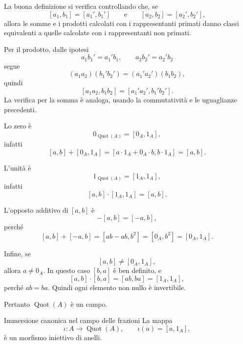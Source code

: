 \documentclass[a4paper]{article}
\begin{document}
\begin{radioactive}
\begin{snippetproof}{}
    La buona definizione si verifica controllando che, se
    \[
        [a_1,b_1]=[a_1',b_1']
        \qquad
        \text{e}
        \qquad
        [a_2,b_2]=[a_2',b_2'],
    \]
    allora le somme e i prodotti calcolati con i rappresentanti primati danno classi equivalenti a quelle calcolate con i rappresentanti non primati.

    Per il prodotto, dalle ipotesi
    \[
        a_1b_1'=a_1'b_1,
        \qquad
        a_2b_2'=a_2'b_2
    \]
    segue
    \[
        (a_1a_2)(b_1'b_2')
        =
        (a_1'a_2')(b_1b_2),
    \]
    quindi
    \[
        [a_1a_2,b_1b_2]
        =
        [a_1'a_2',b_1'b_2'].
    \]
    La verifica per la somma è analoga, usando la commutatività e le uguaglianze precedenti.

    Lo zero è
    \[
        0_{\operatorname{Quot}(A)}=[0_A,1_A],
    \]
    infatti
    \[
        [a,b]+[0_A,1_A]
        =
        [a\cdot 1_A+0_A\cdot b,b\cdot 1_A]
        =
        [a,b].
    \]

    L'unità è
    \[
        1_{\operatorname{Quot}(A)}=[1_A,1_A],
    \]
    infatti
    \[
        [a,b]\cdot [1_A,1_A]
        =
        [a,b].
    \]

    L'opposto additivo di \([a,b]\) è
    \[
        -[a,b]=[-a,b],
    \]
    perché
    \[
        [a,b]+[-a,b]=[ab-ab,b^2]=[0_A,b^2]=[0_A,1_A].
    \]

    Infine, se
    \[
        [a,b]\neq [0_A,1_A],
    \]
    allora \(a\neq 0_A\). In questo caso \([b,a]\) è ben definito, e
    \[
        [a,b]\cdot [b,a]=[ab,ba]=[1_A,1_A],
    \]
    perché \(ab=ba\). Quindi ogni elemento non nullo è invertibile.

    Pertanto \(\operatorname{Quot}(A)\) è un campo.
\end{snippetproof}
\end{radioactive}

\begin{radioactive}
\begin{snippetproposition}{Immersione canonica nel campo delle frazioni}
    La mappa
    \[
        \iota\colon A\to \operatorname{Quot}(A),
        \qquad
        \iota(a)=[a,1_A],
    \]
    è un morfismo iniettivo di anelli.
\end{snippetproposition}
\end{radioactive}
\end{document}
